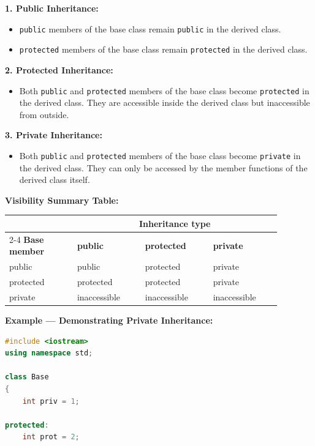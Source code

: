 \documentclass[12pt,a3paper]{article}
\begin{document}
\begin{enumerate}
\begin{tcolorbox}[enhanced,breakable,ansbox,colback=cG!4,colframe=cG,
 boxrule=0.8pt,arc=5pt,
 title={\textbf{Answer --- Visibility of Class Members in Inheritance}},
 fonttitle=\bfseries\color{white},colbacktitle=cG]
\textbf{1. Public Inheritance:}
\begin{itemize}
    \item \texttt{public} members of the base class remain \texttt{public} in the derived class.
    \item \texttt{protected} members of the base class remain \texttt{protected} in the derived class.
\end{itemize}

\textbf{2. Protected Inheritance:}
\begin{itemize}
    \item Both \texttt{public} and \texttt{protected} members of the base class become \texttt{protected} in the derived class. They are accessible inside the derived class but inaccessible from outside.
\end{itemize}

\textbf{3. Private Inheritance:}
\begin{itemize}
    \item Both \texttt{public} and \texttt{protected} members of the base class become \texttt{private} in the derived class. They can only be accessed by the member functions of the derived class itself.
\end{itemize}

\vspace{0.5em}
\textbf{Visibility Summary Table:}
\begin{center}
\small
\begin{tabular}{@{}p{0.22\linewidth}p{0.22\linewidth}p{0.22\linewidth}p{0.22\linewidth}@{}}
\toprule
& \multicolumn{3}{c}{\textbf{Inheritance type}} \\
\cmidrule{2-4}
\textbf{Base member} & \textbf{public} & \textbf{protected} & \textbf{private} \\
\midrule
public  & public  & protected & private \\
protected & protected & protected & private \\
private  & inaccessible & inaccessible & inaccessible \\
\bottomrule
\end{tabular}
\end{center}

\textbf{Example --- Demonstrating Private Inheritance:}
\begin{lstlisting}[language=C++]
#include <iostream>
using namespace std;

class Base
{
    int priv = 1;

protected:
    int prot = 2;


\end{lstlisting}
\end{tcolorbox}
\end{enumerate}
\end{document}

